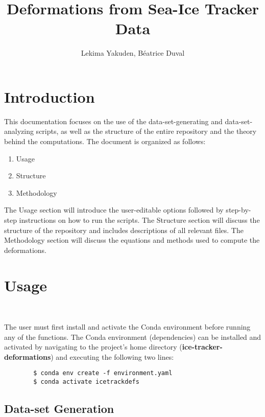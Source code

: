 \documentclass{article}
\begin{document}
\title{Deformations from Sea-Ice Tracker Data}

\author{Lekima Yakuden, Béatrice Duval}

\maketitle

\tableofcontents

\section{Introduction}

This documentation focuses on the use of the data-set-generating and data-set-analyzing scripts, as well as the structure of the entire repository and the theory behind the computations. The document is organized as follows:
\begin{enumerate}
    \item Usage
    \item Structure
    \item Methodology
\end{enumerate}
The Usage section will introduce the user-editable options followed by step-by-step instructions on how to run the scripts. The Structure section will discuss the structure of the repository and includes descriptions of all relevant files. The Methodology section will discuss the equations and methods used to compute the deformations.

\section{Usage}\
\label{Usage}

    The user must first install and activate the Conda environment before running any of the functions. The Conda environment (dependencies) can be installed and activated by navigating to the project's home directory (\textbf{ice-tracker-deformations}) and executing the following two lines:

    \begin{verbatim}
        $ conda env create -f environment.yaml
        $ conda activate icetrackdefs
    \end{verbatim}

    \subsection{Data-set Generation}
\end{document}
